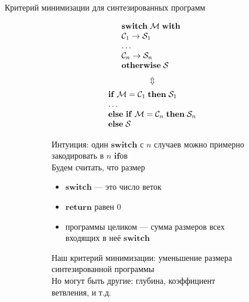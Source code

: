 \documentclass[aspectratio=169
  , xcolor={svgnames}
  , hyperref={ colorlinks,citecolor=Blue
             , linkcolor=DarkRed,urlcolor=DarkBlue}
  , russian
  ]{beamer}
\newcommand{\primi}[1]{\ensuremath{\mathbf{#1}}}
\newcommand{\ir}{\ensuremath{\mathcal{S}}}
\begin{document}
\begin{frame}[fragile]{Критерий минимизации для синтезированных программ}
\begin{figure}
\begin{subfigure}[b]{0.3\linewidth}
\[
  \begin{array}{l}
  \primi{switch}\;\mathcal{M}\;\primi{with}\; \\
  \mathcal{C}_1\; \primi{\rightarrow}\; \ir_1\\
  \dots \\
  \mathcal{C}_n\; \primi{\rightarrow}\; \ir_n\\
  \primi{otherwise}\;\ir\\
  \end{array}\\
\]
\[
  \Updownarrow
\]
\[
  \begin{array}{l}
  \primi{if}\; \mathcal{M} = \mathcal{C}_1\;\primi{then}\; \ir_1\\
  \dots \\
  \primi{else\ if}\; \mathcal{M} = \mathcal{C}_n\; \primi{then}\;  \ir_n\\
  \primi{else}\;\ir\\
  \end{array}\\
\]
\vspace{1cm}

\end{subfigure}
\hspace{1cm}
\begin{subfigure}[b]{0.6\linewidth}
Интуиция: один \primi{switch} с $n$ случаев можно примерно закодировать в  $n$ \primi{if}ов\\

Будем считать, что размер
\begin{itemize}
\item \primi{switch} --- это число веток
\item \primi{return} равен 0
\item программы целиком --- сумма размеров всех входящих в неё \primi{switch}
\end{itemize}
Наш критерий минимизации: уменьшение размера синтезированной программы \\

Но могут быть другие: глубина, коэффициент ветвления, и т.д.
\end{subfigure}
\end{figure}

\end{frame}
\end{document}
